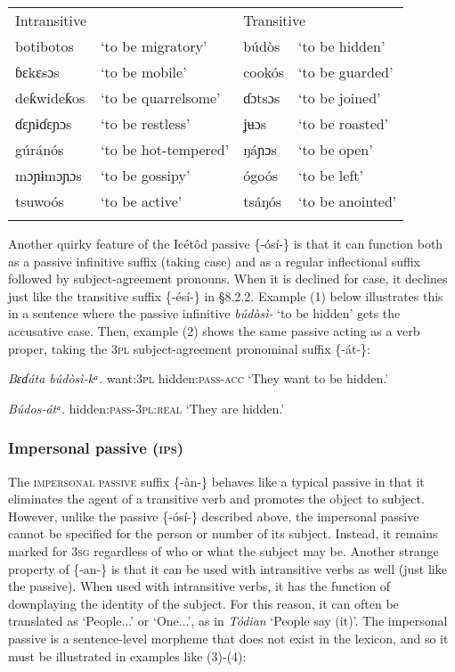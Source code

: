 \begin{table}
\begin{table}
\begin{tabularx}{\textwidth}{XXXX}
Intransitive &  & \multicolumn{2}{X}{Transitive}\\
botibotos & ‘to be migratory’ & búdòs & ‘to be hidden’\\
ɓɛkɛsɔs & ‘to be mobile’ & cookós & ‘to be guarded’\\
deƙwideƙos & ‘to be quarrelsome’ & ɗɔtsɔs & ‘to be joined’\\
ɗɛɲɨɗɛɲɔs & ‘to be restless’ & ʝʉɔs & ‘to be roasted’\\
gúránós & ‘to be hot-tempered’ & ŋáɲɔs & ‘to be open’\\
mɔɲɨmɔɲɔs & ‘to be gossipy’ & ógoós & ‘to be left’\\
tsuwoós & ‘to be active’ & tsáŋós & ‘to be anointed’\\
\lspbottomrule
\end{tabularx}
\end{table}
Another quirky feature of the Icétôd passive \{-ósí-\} is that it can function both as a passive infinitive suffix (taking case) and as a regular inflectional suffix followed by subject-agreement pronouns. When it is declined for case, it declines just like the transitive suffix \{-ésí-\} in §8.2.2. Example (1) below illustrates this in a sentence where the passive infinitive \textit{búdòsì- }‘to be hidden’ gets the accusative case. Then, example (2) shows the same passive acting as a verb proper, taking the 3\textsc{pl} subject-agreement pronominal suffix \{-át-\}:




\textit{Bɛɗáta   búd}\textit{òsì}\textit{{}-kᵃ.}
want:\textsc{3pl}   hidden:\textsc{pass-acc}
‘They want to be hidden.’




\textit{Búd}\textit{os}\textit{{}-átᵃ.}
hidden:\textsc{pass}{}-\textsc{3pl:real}
‘They are hidden.’




\subsubsection{Impersonal passive (\textsc{ips})}

The \textsc{impersonal passive} suffix \{-àn-\} behaves like a typical passive in that it eliminates the agent of a transitive verb and promotes the object to subject. However, unlike the passive \{-ósí-\} described above, the impersonal passive cannot be specified for the person or number of its subject. Instead, it remains marked for 3\textsc{sg} regardless of who or what the subject may be. Another strange property of \{-an-\} is that it can be used with intransitive verbs as well (just like the passive). When used with intransitive verbs, it has the function of downplaying the identity of the subject. For this reason, it can often be translated as ‘People...’ or ‘One...’, as in \textit{Tódian} ‘People say (it)’. The impersonal passive is a sentence-level morpheme that does not exist in the lexicon, and so it must be illustrated in examples like (3)-(4):





\end{table}
